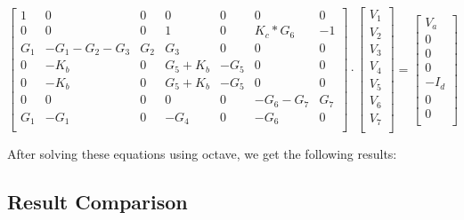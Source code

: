 \[
\begin{bmatrix}
1 & 0 & 0 & 0 & 0 & 0 & 0\\
0 & 0 & 0 & 1 & 0 & K_c * G_6 & -1\\
G_1 & -G_1-G_2 - G_3 & G_2 & G_3 & 0 & 0 & 0\\
0 & -K_b & 0 & G_5 + K_b & -G_5 & 0 & 0\\
0 & -K_b & 0 & G_5 + K_b & -G_5 & 0 & 0\\
0 & 0 & 0 & 0 & 0 & -G_6-G_7 & G_7\\
G_1 & -G_1 & 0 & -G_4 & 0 & -G_6 & 0\\
\end{bmatrix}
\cdot
\begin{bmatrix}
V_1\\
V_2\\
V_3\\
V_4\\
V_5\\
V_6\\
V_7\\
\end{bmatrix}
=
\begin{bmatrix}
V_a\\
0\\
0\\
0\\
-I_d\\
0\\
0\\
\end{bmatrix}
\]

After solving these equations using octave, we get 
the following results:


\subsection{Result Comparison }
